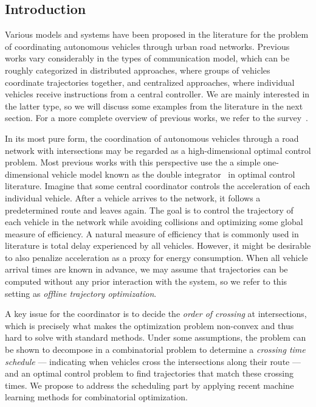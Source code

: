 \documentclass[a4paper]{article}
\author{Jeroen van Riel}
\date{\monthyeardate\today}
\title{}
\theoremstyle{definition}
\theoremstyle{plain}
\begin{document}

\subsection*{Introduction}


Various models and systems have been proposed in the literature for the problem
of coordinating autonomous vehicles through urban road networks. Previous works
vary considerably in the types of communication model, which can be roughly
categorized in distributed approaches, where groups of vehicles coordinate
trajectories together, and centralized approaches, where individual vehicles
receive instructions from a central controller.
%
We are mainly interested in the latter type, so we will discuss some examples
from the literature in the next section. For a more complete overview of previous
works, we refer to the survey~\cite{khayatianSurveyIntersectionManagement2020}.


In its most pure form, the coordination of autonomous vehicles through a road
network with intersections may be regarded as a high-dimensional optimal control
problem. Most previous works with this perspective use the a simple
one-dimensional vehicle model known as the double integrator~\cite{raoNaiveControlDouble2001} in optimal
control literature. Imagine that some central coordinator controls the
acceleration of each individual vehicle.
After a vehicle arrives to the network, it follows a predetermined route and
leaves again. The goal is to control the trajectory of each vehicle in the
network while avoiding collisions and optimizing some global measure of
efficiency. A natural measure of efficiency that is commonly used in literature
is total delay experienced by all vehicles. However, it might be desirable to
also penalize acceleration as a proxy for energy consumption.
When all vehicle arrival times are known in advance, we may assume that
trajectories can be computed without any prior interaction with the system, so
we refer to this setting as \textit{offline trajectory optimization}.

A key issue for the coordinator is to decide the \textit{order of crossing} at
intersections, which is precisely what makes the optimization problem non-convex
and thus hard to solve with standard methods. Under some assumptions, the
problem can be shown to decompose in a combinatorial problem to determine a
\textit{crossing time schedule} --- indicating when vehicles cross the intersections
along their route --- and an optimal control problem to find trajectories that
match these crossing times. We propose to address the scheduling part by
applying recent machine learning methods for combinatorial optimization.
\end{document}

